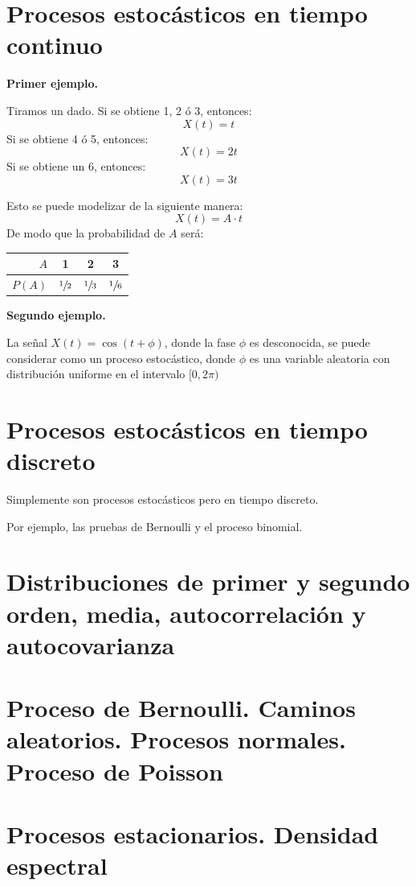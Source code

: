 \documentclass[a4paper]{book}
\begin{document}
\section{Procesos estocásticos en tiempo continuo}
\textbf{Primer ejemplo.}

Tiramos un dado. Si se obtiene 1, 2 ó 3, entonces:
\[X(t) = t\]
Si se obtiene 4 ó 5, entonces:
\[X(t) = 2t\]
Si se obtiene un 6, entonces:
\[X(t) = 3t\]

Esto se puede modelizar de la siguiente manera:
\[X(t) = A\cdot t\]
De modo que la probabilidad de $A$ será:
\begin{center}
	\begin{tabular}{r || c | c | c}
		$A$    & 1              & 2              & 3              \\ \hline
		$P(A)$ & $\sfrac{1}{2}$ & $\sfrac{1}{3}$ & $\sfrac{1}{6}$
	\end{tabular}
\end{center}

\textbf{Segundo ejemplo.}

La señal $X(t) = \cos\left( t+\phi \right)$, donde la fase $\phi$ es desconocida, se puede considerar como un proceso estocástico, donde $\phi$ es una variable aleatoria con distribución uniforme en el intervalo $[0, 2\pi )$




\section{Procesos estocásticos en tiempo discreto}

Simplemente son procesos estocásticos pero en tiempo discreto.

Por ejemplo, las pruebas de Bernoulli y el proceso binomial.



\section{Distribuciones de primer y segundo orden, media, autocorrelación y autocovarianza}

\section{Proceso de Bernoulli. Caminos aleatorios. Procesos normales. Proceso de Poisson}

\section{Procesos estacionarios. Densidad espectral}
\end{document}
